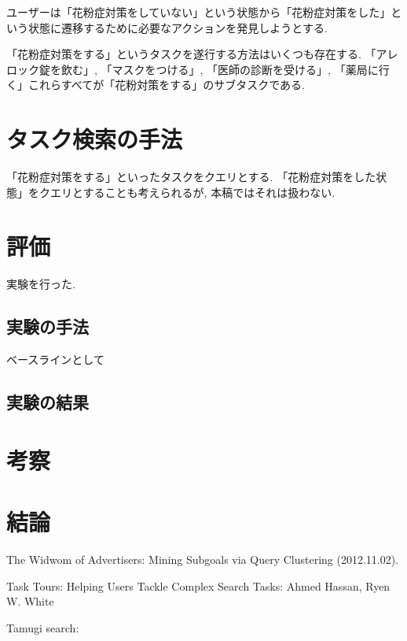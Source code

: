 \documentclass[submit,techreq]{ipsj}
\begin{document}
ユーザーは「花粉症対策をしていない」という状態から「花粉症対策をした」という状態に遷移するために必要なアクションを発見しようとする.

「花粉症対策をする」というタスクを遂行する方法はいくつも存在する. 「アレロック錠を飲む」, 「マスクをつける」, 「医師の診断を受ける」, 「薬局に行く」これらすべてが「花粉対策をする」のサブタスクである.

\section{タスク検索の手法}

「花粉症対策をする」といったタスクをクエリとする.
「花粉症対策をした状態」をクエリとすることも考えられるが, 本稿ではそれは扱わない.

\section{評価}
実験を行った.

\subsection{実験の手法}
ベースラインとして

\subsection{実験の結果}

\section{考察}


\section{結論}




\begin{thebibliography}{10}


The Widwom of Advertisers: Mining Subgoals via Query Clustering
(2012.11.02).

Task Tours: Helping Users Tackle Complex Search Tasks:
Ahmed Hassan, Ryen W. White

Tamugi search:




\end{thebibliography}



\begin{biography}
%
\end{biography}
\end{document}

